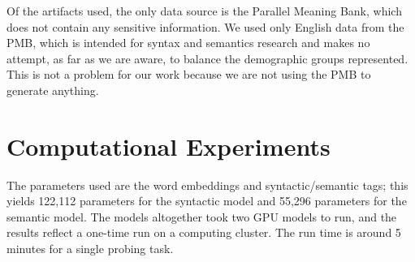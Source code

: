 \documentclass[11pt,a4paper]{article}
\begin{document}
Of the artifacts used, the only data source is the Parallel Meaning Bank, which does not contain any sensitive information. We used only English data from the PMB, which is intended for syntax and semantics research and makes no attempt, as far as we are aware, to balance the demographic groups represented. This is not a problem for our work because we are not using the PMB to generate anything.

\section*{Computational Experiments}
The parameters used are the word embeddings and syntactic/semantic tags; this yields 122,112 parameters for the syntactic model and 55,296 parameters for the semantic model. The models altogether took two GPU models to run, and the results reflect a one-time run on a computing cluster. The run time is around 5 minutes for a single probing task.


\end{document}
